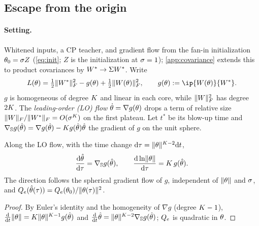 \subsection{Escape from the origin}\label{app:escape}

\paragraph{Setting.}
Whitened inputs, a CP teacher, and gradient flow from the fan-in initialization $\theta_0=\sigma Z$
(\cref{eq:init}; $Z$ is the initialization at $\sigma=1$); \cref{app:covariance} extends this to product
covariances by $W^{*}\to\Sigma W^{*}$. Write
\begin{equation}\label{eq:A-loss-g}
  \Loss(\params)=\tfrac12\normF{\Wt}^2-g(\params)+\tfrac12\normF{\W(\params)}^2,\qquad
  g(\params):=\ip{\W(\params)}{\Wt}.
\end{equation}
$g$ is homogeneous of degree $K$ and linear in each core, while $\lVert W\rVert_{F}^2$ has degree $2K$. The
\emph{leading-order (LO) flow} $\dot{\theta}=\nabla g(\theta)$ drops a term of relative size
$\lVert W\rVert_{F}/\lVert W^{*}\rVert_{F}=O(\sigma^{K})$ on the first plateau. Let $t^*$ be its blow-up time and
$\nabla_{\mathbb S}g(\hat{\theta})=\nabla g(\hat{\theta})-K g(\hat{\theta})\hat{\theta}$ the gradient of $g$
on the unit sphere.

\begin{proposition}\label{prop:A-spherical}
  \proven{} 
  Along the LO flow, with the time change $\mathrm{d}\tau=\lVert\theta\rVert^{K-2}\mathrm{d} t$,
  \begin{equation}\label{eq:A-spherical}
    \frac{\mathrm{d}\hat{\theta}}{\mathrm{d}\tau}=\nabla_{\mathbb S}g(\hat{\theta}),\qquad
    \frac{\mathrm{d}\ln\lVert\theta\rVert}{\mathrm{d}\tau}=K\,g(\hat{\theta}).
  \end{equation}
  The direction follows the spherical gradient flow of $g$, independent of $\lVert\theta\rVert$ and $\sigma$, and
  $Q_{e}(\hat{\theta}(\tau))=Q_{e}(\theta_0)/\lVert\theta(\tau)\rVert^2$.
\end{proposition}
\begin{proof}
  By Euler's identity and the homogeneity of $\nabla g$ (degree $K-1$),
  $\frac{\mathrm{d}}{\mathrm{d} t}\lVert\theta\rVert=K\lVert\theta\rVert^{K-1}g(\hat{\theta})$ and
  $\frac{\mathrm{d}}{\mathrm{d} t}\hat{\theta}=\lVert\theta\rVert^{K-2}\nabla_{\mathbb S}g(\hat{\theta})$; $Q_{e}$ is quadratic in $\theta$.
\end{proof}

